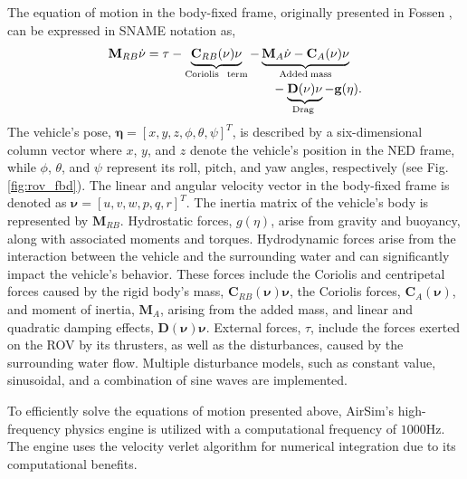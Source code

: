 The equation of motion in the body-fixed frame, originally presented in Fossen \cite{fossen}, can be expressed in SNAME notation \cite{SNAME} as, 
%
\begin{equation}\label{eq:eom}
  \begin{multlined}
    \mathbf{M}_{RB}\dot{\mathbf{\nu}}= \tau - \underbrace{ \mathbf{C}_{RB}(\mathbf{\nu})\mathbf{\nu} }_\text{Coriolis \hspace{1 pt} term} - \underbrace{ \mathbf{M}_A \dot{\mathbf{\nu}} - 
    \mathbf{C}_A(\mathbf{\nu}) \mathbf{\nu} }_\text{Added\hspace{2pt}mass}     
    \\
    - \underbrace{ \mathbf{D}(\mathbf{\nu})\mathbf{{\mathbf{\nu}} }}_\text{Drag } - \mathbf{g}(\mathbf{\eta}).
    \end{multlined}
\end{equation}
%
The vehicle's pose, $\mathbf{\eta}=[x, y, z, \phi, \theta, \psi]^T$, is described by a six-dimensional column vector where $x$, $y$, and $z$ denote the vehicle's position in the \ac{NED} frame, while $\phi$, $\theta$, and $\psi$ represent its roll, pitch, and yaw angles, respectively (see Fig. \ref{fig:rov_fbd}).
The linear and angular velocity vector in the body-fixed frame is denoted as $\mathbf{\nu} = [u, v, w, p, q, r]^T$. The inertia matrix of the vehicle's body is represented by $\mathbf{M}_{RB}$.
Hydrostatic forces, $g(\eta)$, arise from gravity and buoyancy, along with associated moments and torques.
Hydrodynamic forces arise from the interaction between the vehicle and the surrounding water and can significantly impact the vehicle's behavior. These forces include the Coriolis and centripetal forces caused by the rigid body's mass, $\mathbf{C}_{RB}(\mathbf{\nu})\mathbf{\nu}$, the Coriolis forces, $\mathbf{C}_A(\mathbf{\nu})$, and moment of inertia, $\mathbf{M}_{A}$, arising from the added mass, and linear and quadratic damping effects, $\mathbf{D}(\mathbf{\nu})\mathbf{{\nu} }$.
External forces, $\tau$, include the forces exerted on the \ac{ROV} by its thrusters, as well as the disturbances, caused by the surrounding water flow. Multiple disturbance models, such as constant value, sinusoidal, and a combination of sine waves are implemented.


To efficiently solve the equations of motion presented above, AirSim's high-frequency physics engine is utilized with a computational frequency of $1000 \textrm{Hz}$. The engine uses the velocity verlet algorithm for numerical integration due to its computational benefits.


